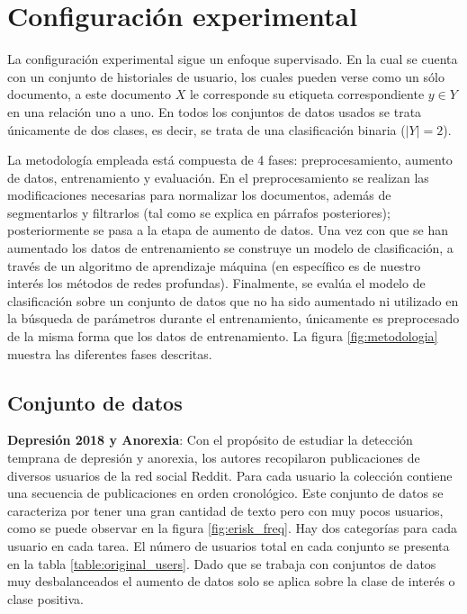 
\section{Configuración experimental}


La configuración experimental sigue  un enfoque supervisado. En la cual se cuenta con un conjunto de historiales de usuario, los cuales pueden verse como un sólo documento, a este documento $X$ le corresponde su etiqueta correspondiente $y \in Y$  en una relación uno a uno. En todos los conjuntos de datos usados se trata únicamente de dos clases, es decir, se trata de una clasificación binaria ($|Y| = 2$). 

La metodología empleada está compuesta de 4 fases:  preprocesamiento, aumento de datos, entrenamiento y evaluación. En el preprocesamiento se realizan las modificaciones necesarias para normalizar los documentos, además de segmentarlos y filtrarlos (tal como se explica en párrafos posteriores); posteriormente se pasa a la etapa de aumento de datos. Una vez con que se han aumentado los datos de entrenamiento se construye un modelo de clasificación, a través de un algoritmo de aprendizaje máquina (en específico es de nuestro interés los métodos de redes profundas). Finalmente, se evalúa el modelo de clasificación sobre un conjunto de datos que no ha sido aumentado ni utilizado en la búsqueda de parámetros durante el entrenamiento, únicamente es preprocesado de la misma forma que los datos de entrenamiento. La figura \ref{fig:metodologia} muestra las diferentes fases descritas.



\subsection{Conjunto de datos}

\textbf{Depresión 2018 y Anorexia}: Con el propósito de estudiar la detección temprana de depresión y anorexia, los autores \citep{Losada2018} recopilaron publicaciones de diversos usuarios de la red social Reddit. Para cada usuario la colección contiene una secuencia de publicaciones en orden cronológico. Este conjunto de datos se caracteriza por tener una gran cantidad de texto pero con muy pocos usuarios, como se puede observar en la figura \ref{fig:erisk_freq}. Hay dos categorías para cada usuario en cada tarea. El número de usuarios total en cada conjunto se presenta en la tabla \ref{table:original_users}. Dado que se trabaja con conjuntos de datos muy desbalanceados el aumento de datos solo se aplica sobre la clase de interés o clase positiva.

